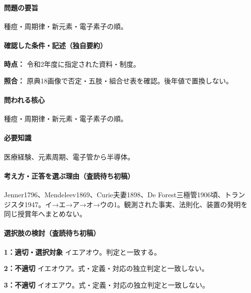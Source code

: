 \paragraph{問題の要旨} 種痘・周期律・新元素・電子素子の順。

\paragraph{確認した条件・記述（独自要約）}\mbox{}\par

\noindent\textbf{時点：} 令和2年度に指定された資料・制度。\par

\noindent\textbf{照合：} 原典18画像で否定・五肢・組合せ表を確認。後年値で置換しない。\par

\paragraph{問われる核心} 種痘・周期律・新元素・電子素子の順。

\paragraph{必要知識} 医療経験、元素周期、電子管から半導体。

\paragraph{考え方・正答を選ぶ理由（査読待ち初稿）} Jenner1796、Mendeleev1869、Curie夫妻1898、De Forest三極管1906頃、トランジスタ1947。イ→エ→ア→オ→ウの1。観測された事実、法則化、装置の発明を同じ授賞年へまとめない。

\paragraph{選択肢の検討（査読待ち初稿）}\mbox{}\par

\noindent\textbf{1：適切・選択対象} イエアオウ。判定と一致する。\par

\noindent\textbf{2：不適切} イエオウア。式・定義・対応の独立判定と一致しない。\par

\noindent\textbf{3：不適切} イオエアウ。式・定義・対応の独立判定と一致しない。\par

